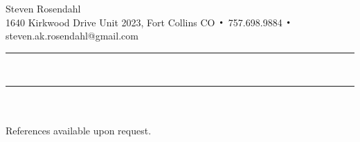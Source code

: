 \documentclass{hw}
\DeclareMathOperator*{\Bigcdot}{\scalerel*{\cdot}{\bigodot}}
\begin{document}
\noindent
\begin{center}
{\huge Steven Rosendahl}\\
{\small 1640 Kirkwood Drive Unit 2023, Fort Collins CO $\Bigcdot$ 757.698.9884 $\Bigcdot$
steven.ak.rosendahl@gmail.com}\\
\end{center}
\hrule
\noindent \\

\hrule
\noindent \\


\noindent\\
References available upon request.
\end{document}

